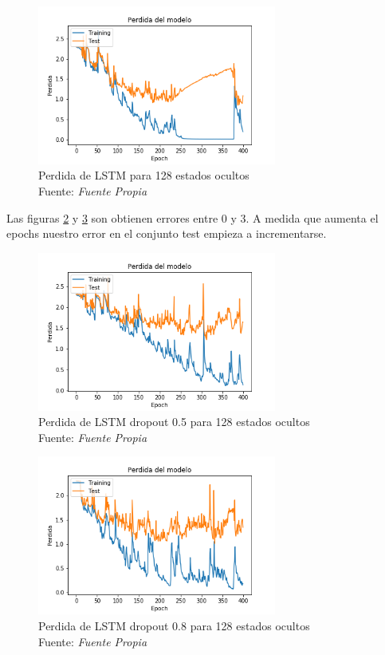 \begin{figure}[H]
	\centering
	\includegraphics[width=0.7\textwidth]{Figures/lstm_400_cost_13mfcc}
	\caption{Perdida de LSTM para 128 estados ocultos\\ Fuente: {\textit{Fuente Propia}}}
	\label{LSTMsimplecost}
\end{figure} 
Las figuras \ref{LSTMdropout5cost} y \ref{LSTMdropout8cost} son obtienen errores entre 0 y 3. A medida que aumenta el epochs nuestro error en el conjunto test empieza a incrementarse.
\begin{figure}[H]
	\centering
	\includegraphics[width=0.7\textwidth]{Figures/lstm_400drop05_cost_13mfcc}
	\caption{Perdida de LSTM dropout 0.5 para 128 estados ocultos\\ Fuente: {\textit{Fuente Propia}}}
	\label{LSTMdropout5cost}
\end{figure} 


\begin{figure}[H]
	\centering
	\includegraphics[width=0.7\textwidth]{Figures/lstm_400drop08_cost_13mfcc}
	\caption{Perdida de LSTM dropout 0.8 para 128 estados ocultos\\ Fuente: {\textit{Fuente Propia}}}
	\label{LSTMdropout8cost}
\end{figure} 


